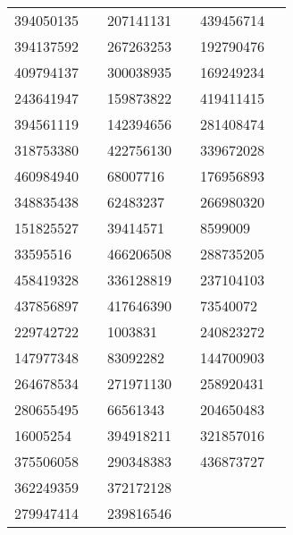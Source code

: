 \begin{longtable}{llllll}
394050135 & \cite{TIC_393831507} & 207141131 & \cite{TIC_207141131} & 439456714 & \cite{TIC_439456714} \\
394137592 & \cite{TIC_394137592} & 267263253 & \cite{TIC_267263253} & 192790476 & \cite{TIC_428699140} \\
409794137 & \cite{TIC_409794137} & 300038935 & \cite{TIC_300038935} & 169249234 & \cite{TIC_332558858} \\
243641947 & \cite{TIC_243641947} & 159873822 & \cite{TIC_159873822} & 419411415 & \cite{TIC_419411415} \\
394561119 & \cite{TIC_394561119} & 142394656 & \cite{TIC_142394656} & 281408474 & \cite{TIC_409794137} \\
318753380 & \cite{TIC_428699140} & 422756130 & \cite{TIC_422756130} & 339672028 & \cite{TIC_66561343} \\
460984940 & \cite{TIC_460984940} & 68007716 & \cite{TIC_156648452} & 176956893 & \cite{TIC_176956893} \\
348835438 & \cite{TIC_348835438} & 62483237 & \cite{TIC_428699140} & 266980320 & \cite{TIC_266980320} \\
151825527 & \cite{TIC_428699140} & 39414571 & \cite{TIC_156648452} & 8599009 & \cite{TIC_156648452} \\
33595516 & \cite{TIC_33595516} & 466206508 & \cite{TIC_466206508} & 288735205 & \cite{TIC_288735205} \\
458419328 & \cite{TIC_458419328} & 336128819 & \cite{TIC_336128819} & 237104103 & \cite{TIC_219854185} \\
437856897 & \cite{TIC_437856897} & 417646390 & \cite{TIC_70524163} & 73540072 & \cite{TIC_73540072} \\
229742722 & \cite{TIC_229742722} & 1003831 & \cite{TIC_261867566} & 240823272 & \cite{TIC_70524163} \\
147977348 & \cite{TIC_409794137} & 83092282 & \cite{TIC_162802770} & 144700903 & \cite{TIC_144700903} \\
264678534 & \cite{TIC_264678534} & 271971130 & \cite{TIC_271971130} & 258920431 & \cite{TIC_70524163} \\
280655495 & \cite{TIC_156648452} & 66561343 & \cite{TIC_66561343} & 204650483 & \cite{TIC_394918211} \\
16005254 & \cite{TIC_16005254} & 394918211 & \cite{TIC_394918211} & 321857016 & \cite{TIC_321857016} \\
375506058 & \cite{TIC_375506058} & 290348383 & \cite{TIC_290348383} & 436873727 & \cite{TIC_436873727} \\
362249359 & \cite{TIC_10837041} & 372172128 & \cite{TIC_372172128} \\
279947414 & \cite{TIC_156648452} & 239816546 & \cite{TIC_70524163} \\
\hline
\end{longtable}